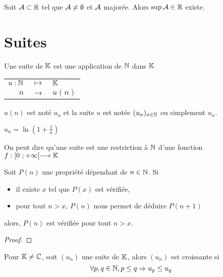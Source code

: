 \begin{axio}
Soit $\AA \subset \RR$ tel que $\AA \neq \emptyset$ et $\AA$ majorée. Alors $\sup \AA \in \RR$ existe.
\end{axio}

\section{Suites}
\begin{defi}
Une suite de $\KK$ est une application de $\NN$ dans $\KK$\\
\begin{tabular}{rcl}
$u:\NN$ &$\longmapsto$&$\KK$\\
$n$&$\rightarrow$&$u(n)$
\end{tabular}
\end{defi}
\begin{nota}
$u(n)$ est noté $u_n$ et la suite $u$ est notée $(u_n)_{n\in \NN}$ ou simplement $u_n$.
\end{nota}
$u_n = \ln\left(1+\frac{1}{n}\right)$

\begin{rem}
On peut dire qu'une suite est une restriction à $\NN$ d'une fonction $f:[0~;+\infty[\longrightarrow\KK$
\end{rem}

\begin{axio}[Récurrence]
Soit $P(n)$ une propriété dépendant de $n\in \NN$. Si
\begin{itemize}
	\item il existe $x$ tel que $P(x)$ est vérifiée,
	\item pour tout $n>x$, $P(n)$ nous permet de déduire $P(n+1)$
\end{itemize}
alors, $P(n)$ est vérifiée pour tout $n>x$.
\end{axio}

\begin{prop}\end{prop}

\begin{proof}\end{proof}

\begin{defi}[Monotonie]
Pour $\KK \neq\CC$, soit $(u_n)$ une suite de $\KK$, alors $(u_n)$ est croissante si 
$$\forall p,q \in \NN, p \leq q \Rightarrow u_p \leq u_q$$
\end{defi}
